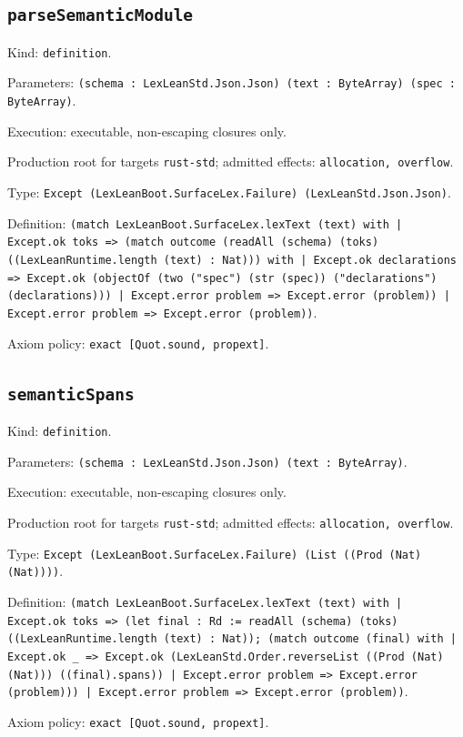 \documentclass[11pt]{article}
\begin{document}
\subsection*{\texttt{parseSemanticModule}}
\noindent Kind: \texttt{definition}.\par
\noindent Parameters: \texttt{(schema : LexLeanStd.Json.Json) (text : ByteArray) (spec : ByteArray)}.\par
\noindent Execution: executable, non-escaping closures only.\par
\noindent Production root for targets \texttt{rust-std}; admitted effects: \texttt{allocation, overflow}.\par
\noindent Type: \texttt{Except (LexLeanBoot.SurfaceLex.Failure) (LexLeanStd.Json.Json)}.\par
\noindent Definition: \texttt{(match LexLeanBoot.SurfaceLex.lexText (text) with | Except.ok toks => (match outcome (readAll (schema) (toks) ((LexLeanRuntime.length (text) : Nat))) with | Except.ok declarations => Except.ok (objectOf (two ("spec") (str (spec)) ("declarations") (declarations))) | Except.error problem => Except.error (problem)) | Except.error problem => Except.error (problem))}.\par
\noindent Axiom policy: \texttt{exact [Quot.sound, propext]}.\par
\subsection*{\texttt{semanticSpans}}
\noindent Kind: \texttt{definition}.\par
\noindent Parameters: \texttt{(schema : LexLeanStd.Json.Json) (text : ByteArray)}.\par
\noindent Execution: executable, non-escaping closures only.\par
\noindent Production root for targets \texttt{rust-std}; admitted effects: \texttt{allocation, overflow}.\par
\noindent Type: \texttt{Except (LexLeanBoot.SurfaceLex.Failure) (List ((Prod (Nat) (Nat))))}.\par
\noindent Definition: \texttt{(match LexLeanBoot.SurfaceLex.lexText (text) with | Except.ok toks => (let final : Rd := readAll (schema) (toks) ((LexLeanRuntime.length (text) : Nat)); (match outcome (final) with | Except.ok \_ => Except.ok (LexLeanStd.Order.reverseList ((Prod (Nat) (Nat))) ((final).spans)) | Except.error problem => Except.error (problem))) | Except.error problem => Except.error (problem))}.\par
\noindent Axiom policy: \texttt{exact [Quot.sound, propext]}.\par
\end{document}

